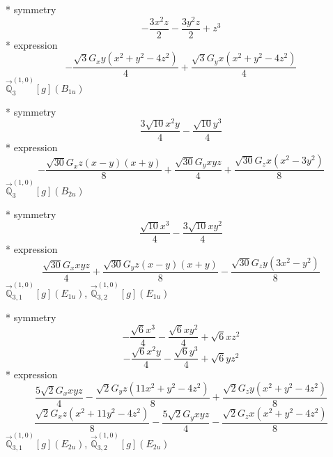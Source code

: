 \documentclass[fleqn,8pt]{jsarticle}
\begin{document}
\noindent\quad ** symmetry
\begin{dmath*}
- \frac{3 x^{2} z}{2} - \frac{3 y^{2} z}{2} + z^{3}
\end{dmath*}
\noindent\quad ** expression
\begin{dmath*}
- \frac{\sqrt{3} G_{x} y \left(x^{2} + y^{2} - 4 z^{2}\right)}{4} + \frac{\sqrt{3} G_{y} x \left(x^{2} + y^{2} - 4 z^{2}\right)}{4}
\end{dmath*}
\noindent\quad $\vec{\mathbb{Q}}_{3}^{(1,0)}[g](B_{1u})$

\noindent\quad ** symmetry
\begin{dmath*}
\frac{3 \sqrt{10} x^{2} y}{4} - \frac{\sqrt{10} y^{3}}{4}
\end{dmath*}
\noindent\quad ** expression
\begin{dmath*}
- \frac{\sqrt{30} G_{x} z \left(x - y\right) \left(x + y\right)}{8} + \frac{\sqrt{30} G_{y} x y z}{4} + \frac{\sqrt{30} G_{z} x \left(x^{2} - 3 y^{2}\right)}{8}
\end{dmath*}
\noindent\quad $\vec{\mathbb{Q}}_{3}^{(1,0)}[g](B_{2u})$

\noindent\quad ** symmetry
\begin{dmath*}
\frac{\sqrt{10} x^{3}}{4} - \frac{3 \sqrt{10} x y^{2}}{4}
\end{dmath*}
\noindent\quad ** expression
\begin{dmath*}
\frac{\sqrt{30} G_{x} x y z}{4} + \frac{\sqrt{30} G_{y} z \left(x - y\right) \left(x + y\right)}{8} - \frac{\sqrt{30} G_{z} y \left(3 x^{2} - y^{2}\right)}{8}
\end{dmath*}
\noindent\quad $\vec{\mathbb{Q}}_{3,1}^{(1,0)}[g](E_{1u})$, $\vec{\mathbb{Q}}_{3,2}^{(1,0)}[g](E_{1u})$

\noindent\quad ** symmetry
\begin{dmath*}
- \frac{\sqrt{6} x^{3}}{4} - \frac{\sqrt{6} x y^{2}}{4} + \sqrt{6} x z^{2}
\end{dmath*}
\begin{dmath*}
- \frac{\sqrt{6} x^{2} y}{4} - \frac{\sqrt{6} y^{3}}{4} + \sqrt{6} y z^{2}
\end{dmath*}
\noindent\quad ** expression
\begin{dmath*}
\frac{5 \sqrt{2} G_{x} x y z}{4} - \frac{\sqrt{2} G_{y} z \left(11 x^{2} + y^{2} - 4 z^{2}\right)}{8} + \frac{\sqrt{2} G_{z} y \left(x^{2} + y^{2} - 4 z^{2}\right)}{8}
\end{dmath*}
\begin{dmath*}
\frac{\sqrt{2} G_{x} z \left(x^{2} + 11 y^{2} - 4 z^{2}\right)}{8} - \frac{5 \sqrt{2} G_{y} x y z}{4} - \frac{\sqrt{2} G_{z} x \left(x^{2} + y^{2} - 4 z^{2}\right)}{8}
\end{dmath*}
\noindent\quad $\vec{\mathbb{Q}}_{3,1}^{(1,0)}[g](E_{2u})$, $\vec{\mathbb{Q}}_{3,2}^{(1,0)}[g](E_{2u})$
\end{document}
